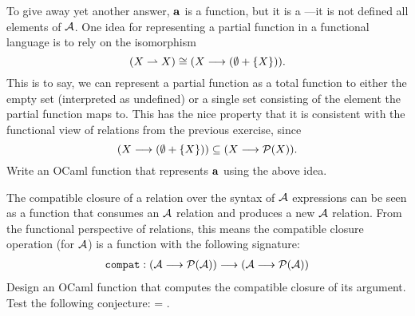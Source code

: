\begin{exercise}
To give away yet another answer, $\mathop{\mathbf{a}}$ is a function, but it is a
---it is not defined all elements of
$\mathcal{A}$.  One idea for representing a partial function in a
functional language is to rely on the isomorphism
\[
(X \rightharpoonup X) \cong (X \longrightarrow (\emptyset + \{X\}))\text.
\]
This is to say, we can represent a partial function as a total
function to either the empty set (interpreted as undefined) or a
single set consisting of the element the partial function maps to.
This has the nice property that it is consistent with the functional
view of relations from the previous exercise, since
\[
(X \longrightarrow (\emptyset + \{X\})) \subseteq 
(X \longrightarrow \mathcal{P}(X))\text.
\]
Write an OCaml function  that represents $\mathop{\mathbf{a}}$
using the above idea.
\end{exercise}

\begin{exercise}
The compatible closure of a relation over the syntax of $\mathcal{A}$
expressions can be seen as a function that consumes an $\mathcal{A}$
relation and produces a new $\mathcal{A}$ relation. From the functional
perspective of relations, this means the compatible closure operation
(for $\mathcal{A}$) is a function with the following signature:
\begin{align*}
{\tt compat} : (\mathcal{A} \longrightarrow \mathcal{P}(\mathcal{A})) \longrightarrow (\mathcal{A} \longrightarrow \mathcal{P}(\mathcal{A}))
\end{align*}
%
Design an OCaml function  that computes the compatible
closure of its argument.  Test the following conjecture: 
= .
\end{exercise}

